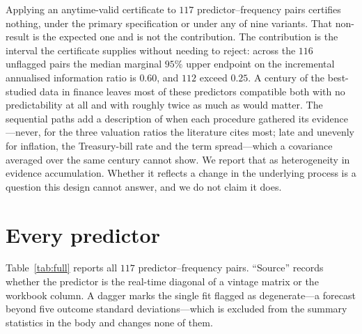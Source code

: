 \documentclass{article}
\theoremstyle{plain}
\theoremstyle{definition}
\begin{document}
Applying an anytime-valid certificate to $117$ predictor--frequency pairs certifies nothing,
under the primary specification or under any of nine variants. That non-result is the expected
one and is not the contribution. The contribution is the interval the certificate supplies
without needing to reject: across the $116$ unflagged pairs the median marginal $95\%$ upper
endpoint on the incremental annualised information ratio is $0.60$, and $112$ exceed $0.25$.
A century of the best-studied data in finance leaves most of these predictors compatible both
with no predictability at all and with roughly twice as much as would matter. The sequential
paths add a description of when each procedure gathered its evidence---never, for the three
valuation ratios the literature cites most; late and unevenly for inflation, the Treasury-bill
rate and the term spread---which a covariance averaged over the same century cannot show. We
report that as heterogeneity in evidence accumulation. Whether it
reflects a change in the underlying process is a question this design cannot answer, and we do
not claim it does.

\appendix

\section{Every predictor}
\label{app:full}

Table~\ref{tab:full} reports all $117$ predictor--frequency pairs. ``Source'' records whether
the predictor is the real-time diagonal of a \citet{goyal2024} vintage matrix or the workbook
column. A dagger marks the single fit flagged as degenerate---a forecast beyond five outcome
standard deviations---which is excluded from the summary statistics in the body and changes
none of them.

\begin{table}[hbtp]
  \centering
  \caption{All predictor--frequency pairs, 1926--2025. Rejecting needs an e-value of $20$;
  the largest observed is $7.47$. ``Ceiling'' is the $95\%$ anytime-valid upper bound on the
  incremental annualised information ratio.}
  \label{tab:full}
  \scriptsize
  
\end{table}



\end{document}

